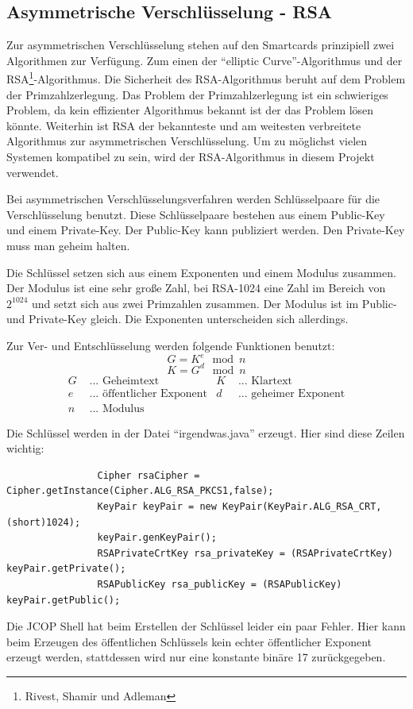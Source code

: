 \documentclass[parskip]{scrartcl}
\begin{document}
		\subsection{Asymmetrische Verschlüsselung - RSA}
			Zur asymmetrischen Verschlüsselung stehen auf den Smartcards prinzipiell zwei Algorithmen zur Verfügung. Zum einen der \enquote{elliptic Curve}-Algorithmus und der RSA\footnote{Rivest, Shamir und Adleman}-Algorithmus. Die Sicherheit des RSA-Algorithmus beruht auf dem Problem der Prim\-zahl\-zerlegung. Das Problem der Primzahlzerlegung ist ein schwieriges Problem, da kein effizienter Algorithmus bekannt ist der das Problem lösen könnte. Weiterhin ist RSA der bekannteste und am weitesten verbreitete Algorithmus zur asymmetrischen Verschlüsselung. Um zu möglichst vielen Systemen kompatibel zu sein, wird der RSA-Algorithmus in diesem Projekt verwendet.
			
			Bei asymmetrischen Verschlüsselungsverfahren werden Schlüsselpaare für die Verschlüs\-selung benutzt. Diese Schlüsselpaare bestehen aus einem Public-Key und einem Private-Key. Der Public-Key kann publiziert werden. Den Private-Key muss man geheim halten.
		
			Die Schlüssel setzen sich aus einem Exponenten und einem Modulus zusammen. Der Modulus ist eine sehr große Zahl, bei RSA-1024 eine Zahl im Bereich von $ 2^{1024} $ und setzt sich aus zwei Primzahlen zusammen. Der Modulus ist im Public- und Private-Key gleich. Die Exponenten unterscheiden sich allerdings.
		
			Zur Ver- und Entschlüsselung werden folgende Funktionen benutzt:  
			 $$ G = K^{e}\mod{n} $$
			 $$ K = G^{d}\mod{n} $$
			 \begin{align*}
			  G & \text{ ... Geheimtext} & K & \text{ ... Klartext} \\
			  e & \text{ ... öffentlicher Exponent} & d & \text{ ... geheimer Exponent} \\
			  n & \text{ ... Modulus} & &
			 \end{align*}
			 
			Die Schlüssel werden in der Datei \enquote{irgendwas.java} erzeugt. Hier sind diese Zeilen wichtig:
			\label{RSAKeyPair}
			\begin{lstlisting}
				Cipher rsaCipher = Cipher.getInstance(Cipher.ALG_RSA_PKCS1,false);
				KeyPair keyPair = new KeyPair(KeyPair.ALG_RSA_CRT, (short)1024);
				keyPair.genKeyPair();
				RSAPrivateCrtKey rsa_privateKey = (RSAPrivateCrtKey) keyPair.getPrivate();
				RSAPublicKey rsa_publicKey = (RSAPublicKey) keyPair.getPublic();
			\end{lstlisting}
			Die JCOP Shell hat beim Erstellen der Schlüssel leider ein paar Fehler. Hier kann beim Erzeugen des öffentlichen Schlüssels kein echter öffentlicher Exponent erzeugt werden, stattdessen wird nur eine konstante binäre 17 zurückgegeben.
		
\end{document}
